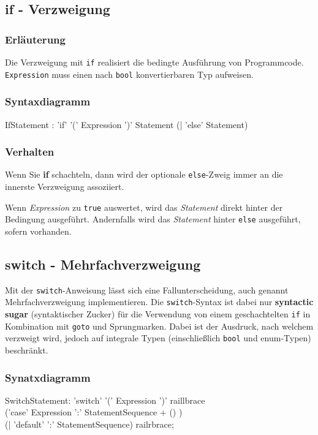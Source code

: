 \documentclass[a4paper]{report}
\begin{document}
\subsection{if - Verzweigung}
\subsubsection{Erläuterung}
Die Verzweigung mit \texttt{if} realisiert die bedingte Ausführung von Programmcode. \texttt{Expression} muss einen nach \texttt{bool} konvertierbaren Typ aufweisen.
\subsubsection{Syntaxdiagramm}
\begin{rail}
	IfStatement : 'if' '(' Expression ')'
							Statement
							(| 'else' Statement)
\end{rail}
\subsubsection{Verhalten}
Wenn Sie \textbf{if} schachteln, dann wird der optionale \texttt{else}-Zweig immer an die innerste Verzweigung assoziiert.

Wenn \textit{Expression} zu \texttt{true} auswertet, wird das \textit{Statement} direkt hinter der Bedingung ausgeführt. Andernfalls wird das \textit{Statement} hinter \texttt{else} ausgeführt, sofern vorhanden.
\subsection{switch - Mehrfachverzweigung}\label{switch}
Mit der \texttt{switch}-Anweisung lässt sich eine Fallunterscheidung, auch genannt Mehrfachverzweigung implementieren. Die \texttt{switch}-Syntax ist dabei nur \textbf{syntactic sugar} (syntaktischer Zucker) für die Verwendung von einem geschachtelten \texttt{if} in Kombination mit \texttt{goto} und Sprungmarken. Dabei ist der Ausdruck, nach welchem verzweigt wird, jedoch auf integrale Typen (einschließlich \texttt{bool} und enum-Typen) beschränkt.
\subsubsection{Synatxdiagramm}
\begin{rail}
	SwitchStatement: 'switch' '(' Expression ')'
						raillbrace \\
							('case' Expression ':' StatementSequence  + () ) \\
							(| 'default' ':' StatementSequence)				
						railrbrace;
\end{rail}
\end{document}
